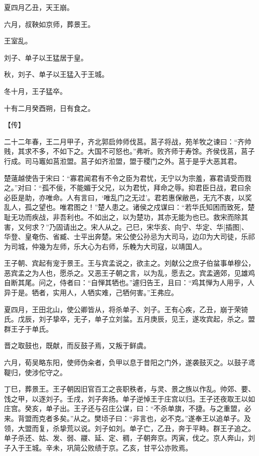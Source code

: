 \documentclass[a4paper,12pt,UTF8,twoside]{ctexbook}
\begin{document}
夏四月乙丑，天王崩。

六月，叔鞅如京师，葬景王。

王室乱。

刘子、单子以王猛居于皇。

秋，刘子、单子以王猛入于王城。

冬十月，王子猛卒。

十有二月癸酉朔，日有食之。

【传】

二十二年春，王二月甲子，齐北郭启帅师伐莒。莒子将战，苑羊牧之谏曰：“齐帅贱，其求不多，不如下之。大国不可怒也。”弗听。败齐师于寿馀。齐侯伐莒，莒子行成。司马竈如莒涖盟。莒子如齐涖盟，盟于稷门之外。莒于是乎大恶其君。

楚薳越使告于宋曰：“寡君闻君有不令之臣为君忧，无宁以为宗羞，寡君请受而戮之。”对曰：“孤不佞，不能媚于父兄，以为君忧，拜命之辱。抑君臣日战，君曰余必臣是助，亦唯命。人有言曰，‘唯乱门之无过’。君若惠保敝邑，无亢不衷，以奖乱人，孤之望也。唯君图之！”楚人患之。诸侯之戍谋曰：“若华氏知困而致死，楚耻无功而疾战，非吾利也。不如出之，以为楚功，其亦无能为也已。救宋而除其害，又何求？”乃固请出之。宋人从之。己巳，宋华亥、向宁、华定、华[插图]、华登、皇奄伤、省臧、士平出奔楚。宋公使公孙忌为大司马，边卬为大司徒，乐祁为司城，仲幾为左师，乐大心为右师，乐輓为大司寇，以靖国人。

王子朝、宾起有宠于景王。王与宾孟说之，欲主之。刘献公之庶子伯蚠事单穆公，恶宾孟之为人也，愿杀之。又恶王子朝之言，以为乱，愿去之。宾孟適郊，见雄鸡自断其尾。问之，侍者曰：“自惮其牺也。”遽归告王，且曰：“鸡其惮为人用乎，人异于是。牺者，实用人，人牺实难，己牺何害。”王弗应。

夏四月，王田北山，使公卿皆从，将杀单子、刘子。王有心疾，乙丑，崩于荣锜氏。戊辰，刘子挚卒，无子，单子立刘蚠。五月庚辰，见王，遂攻宾起，杀之。盟群王子于单氏。

晋之取鼓也，既献，而反鼓子焉，又叛于鲜虞。

六月，荀吴略东阳，使师伪籴者，负甲以息于昔阳之门外，遂袭鼓灭之。以鼓子鸢鞮归，使涉佗守之。

丁巳，葬景王。王子朝因旧官百工之丧职秩者，与灵、景之族以作乱。帅郊、要、饯之甲，以逐刘子。壬戌，刘子奔扬。单子逆悼王于庄宫以归。王子还夜取王以如庄宫。癸亥，单子出。王子还与召庄公谋，曰：“不杀单旗，不捷。与之重盟，必来。背盟而克者多矣。”从之。樊顷子曰：“非言也，必不克。”遂奉王以追单子。及领，大盟而复，杀挚荒以说。刘子如刘。单子亡，乙丑，奔于平畤。群王子追之。单子杀还、姑、发、弱、鬷、延、定、稠，子朝奔京。丙寅，伐之。京人奔山，刘子入于王城。辛未，巩简公败绩于京。乙亥，甘平公亦败焉。
\end{document}
